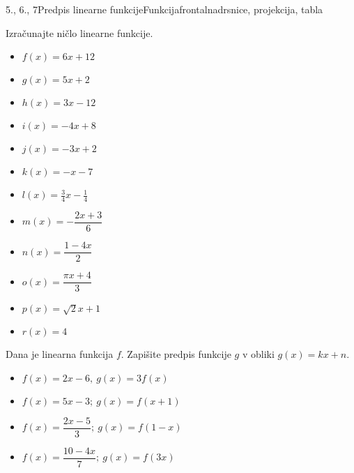 \begin{priprava}{5., 6., 7}{}{Predpis linearne funkcije}{Funkcija}{frontalna}{drsnice, projekcija, tabla}
        
            \begin{naloga}
                Izračunajte ničlo linearne funkcije.
                \begin{multicols}{2}
                    \begin{itemize}
                        \item $f(x)=6x+12$ 
                        \item $g(x)=5x+2$ 
                        \item $h(x)=3x-12$ 
                        \item $i(x)=-4x+8$ 
                        \item $j(x)=-3x+2$ 
                        \item $k(x)=-x-7$ 
                        \item $l(x)=\frac{3}{4}x-\frac{1}{4}$ 
                        \item $m(x)=-\dfrac{2x+3}{6}$ 
                        \item $n(x)=\dfrac{1-4x}{2}$ 
                        \item $o(x)=\dfrac{\pi x+4}{3}$ 
                        \item $p(x)=\sqrt{2}x+1$ 
                        \item $r(x)=4$ 
                    \end{itemize}
                \end{multicols}
            \end{naloga}
        


        
            \begin{naloga}
                Dana je linearna funkcija $f$. Zapišite predpis funkcije $g$ v obliki $g(x)=kx+n$.
                \begin{multicols}{2} 
                \begin{itemize}
                        \item $f(x)=2x-6, ~ g(x)=3f(x)$ 
                        \item $f(x)=5x-3; ~ g(x)=f(x+1)$ 
                        \item $f(x)=\dfrac{2x-5}{3}; ~ g(x)=f(1-x)$ 
                        \item $f(x)=\dfrac{10-4x}{7}; ~ g(x)=f(3x)$ 
                    \end{itemize}
                \end{multicols}
            \end{naloga}
        



\end{priprava}
